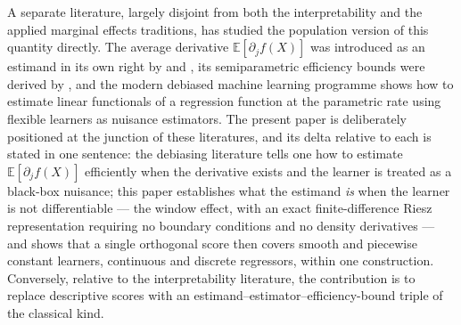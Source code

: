 \documentclass[12pt,a4paper]{article}
\numberwithin{equation}{section}
\theoremstyle{plain}
\theoremstyle{definition}
\newcommand{\E}{\mathbb{E}}
\begin{document}
	A separate literature, largely disjoint from both the interpretability and the
	applied marginal effects traditions, has studied the population version of this
	quantity directly. The average derivative $\E[\partial_j f(X)]$ was introduced as
	an estimand in its own right by \citet{hardle1989} and \citet{powell1989}, its
	semiparametric efficiency bounds were derived by \citet{newey1993}, and the modern
	debiased machine learning programme \citep{chernozhukov2018dml,
	chernozhukov2022riesz} shows how to estimate linear functionals of a regression
	function at the parametric rate using flexible learners as nuisance estimators.
	The present paper is deliberately positioned at the junction of these
	literatures, and its delta relative to each is stated in one sentence: the
	debiasing literature tells one how to estimate $\E[\partial_j f(X)]$ efficiently
	when the derivative exists and the learner is treated as a black-box nuisance;
	this paper establishes what the estimand \emph{is} when the learner is not
	differentiable --- the window effect, with an exact finite-difference Riesz
	representation requiring no boundary conditions and no density derivatives --- and
	shows that a single orthogonal score then covers smooth and piecewise constant
	learners, continuous and discrete regressors, within one construction. Conversely,
	relative to the interpretability literature, the contribution is to replace
	descriptive scores with an estimand--estimator--efficiency-bound triple of the
	classical kind.
	
\end{document}
